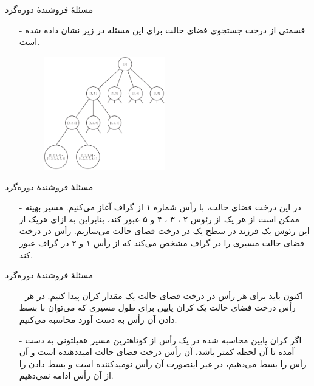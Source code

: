 \begin{frame}{مسئلهٔ فروشندهٔ دوره‌گرد}
\begin{itemize}\itemr
\item[-]
قسمتی از درخت جستجوی فضای حالت برای این مسئله در زیر نشان داده شده است.
\begin{figure}
\includegraphics[width=0.5\textwidth]{figs/chap06/264-tsp}
\end{figure}
\end{itemize}
\end{frame}


\begin{frame}{مسئلهٔ فروشندهٔ دوره‌گرد}
\begin{itemize}\itemr
\item[-]
در این درخت فضای حالت، با رأس شماره ۱ از گراف آغاز می‌کنیم. مسیر بهینه ممکن است از هر یک از رئوس ۲ ، ۳ ، ۴ و ۵ عبور کند، بنابراین به ازای هریک از این رئوس یک فرزند در سطح یک در درخت فضای حالت می‌سازیم. رأس
\m{[1,2]}
در درخت فضای حالت مسیری را در گراف مشخص می‌کند که از رأس ۱ و ۲ در گراف عبور کند.
\end{itemize}
\end{frame}


\begin{frame}{مسئلهٔ فروشندهٔ دوره‌گرد}
\begin{itemize}\itemr
\item[-]
اکنون باید برای هر رأس در درخت فضای حالت یک مقدار کران پیدا کنیم. در هر رأس درخت فضای حالت یک کران پایین برای طول مسیری که می‌توان با بسط دادن آن رأس به دست آورد محاسبه می‌کنیم.
\item[-]
اگر کران پایین محاسبه شده در یک رأس از کوتاهترین مسیر همیلتونی به دست آمده تا آن لحظه کمتر باشد، آن رأس درخت فضای حالت امیددهنده است و آن رأس را بسط می‌دهیم، در غیر اینصورت آن رأس نومیدکننده است و بسط دادن را از آن رأس ادامه نمی‌دهیم.
\end{itemize}
\end{frame}


